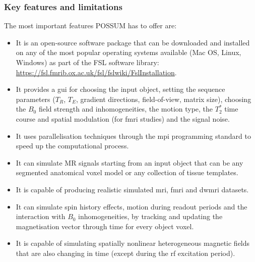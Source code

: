 \hfill

\subsubsection{Key features and limitations}
The most important features POSSUM has to offer are:
\begin{itemize}
    
    \item It is an open-source software package that can be downloaded and installed on any of the most popular operating systems available (Mac OS, Linux, Windows) as part of the FSL software library: \url{https://fsl.fmrib.ox.ac.uk/fsl/fslwiki/FslInstallation}.
    
    \item It provides a \ac{gui} for choosing the input object, setting the sequence parameters ($T_R$, $T_E$, gradient directions, field-of-view, matrix size), choosing the $B_0$ field strength and inhomogeneities, the motion type, the $T_2^*$ time course and spatial modulation (for \ac{fmri} studies) and the signal noise.
    
    \item It uses parallelisation techniques through the \ac{mpi} programming standard to speed up the computational process.
    
    \item It can simulate MR signals starting from an input object that can be any segmented anatomical voxel model or any collection of tissue templates. 
    
    \item It is capable of producing realistic simulated \ac{mri}, \ac{fmri} and \ac{dwmri} datasets.
    
    \item It can simulate spin history effects, motion during readout periods and the interaction with $B_0$ inhomogeneities, by tracking and updating the magnetisation vector through time for every object voxel.
    
    \item It is capable of simulating spatially nonlinear heterogeneous magnetic fields that are also changing in time (except during the \ac{rf} excitation period).
    
\end{itemize}

\hfill

